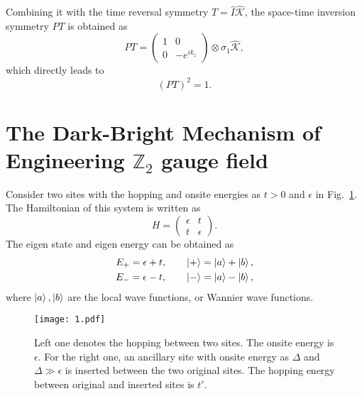 \documentclass[aps,prl,twocolumn,noshowpacs,superscriptaddress]{revtex4-1}
\def \Z {\mathbb{Z}}
\begin{document}
Combining it with the time reversal symmetry $ T=\hat{I}\hat{\mathcal{K}} $, the space-time inversion symmetry $ PT $ is obtained as
\begin{equation}
	PT=\begin{pmatrix}
		1 & 0 \\ 0 & -e^{ik_z}
	\end{pmatrix}\otimes\sigma_1\hat{\mathcal{K}},
\end{equation}
which directly leads to
\begin{equation}
	(PT)^2=1.
\end{equation}



\section{The Dark-Bright Mechanism of Engineering $ \Z_2 $ gauge field}

Consider two sites with the hopping and onsite energies as $ t>0 $ and $ \epsilon $ in Fig.~\ref{figs1}. 
The Hamiltonian of this system is written as
\begin{equation}
	H=\begin{pmatrix}
		\epsilon & t \\ t & \epsilon
	\end{pmatrix}.
\end{equation}
The eigen state and eigen energy can be obtained as
\begin{equation}
	\begin{split}
		E_+&=\epsilon + t,\qquad   \ket{+}=\ket{a}+\ket{b}, \\
		E_-&=\epsilon - t,\qquad   \ket{-}=\ket{a}-\ket{b},
	\end{split}
\end{equation}
where $ \ket{a}, \ket{b} $ are the local wave functions, or Wannier wave functions. 

\begin{figure}[h]
	\centering
	\texttt{[image: 1.pdf]}
	\caption{Left one denotes the hopping between two sites. The onsite energy is $ \epsilon $. For the right one, an ancillary site with onsite energy as $ \Delta $ and $ \Delta\gg\epsilon $ is inserted between the two original sites. The hopping energy between original and inserted sites is $ t' $. \label{figs1}}
\end{figure}
\end{document}
